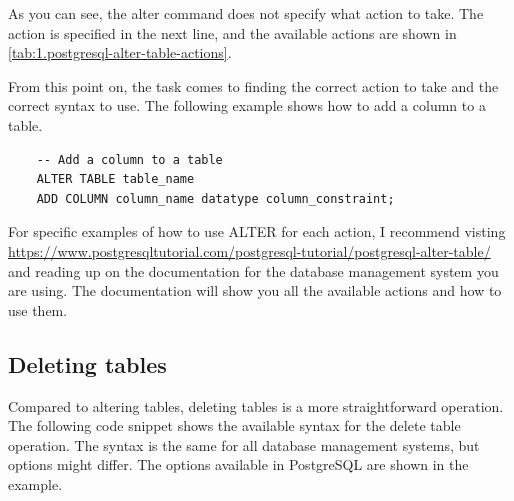 As you can see, the alter command does not specify what action to take. The action is specified in the next line, and the available actions are shown in \cref{tab:1.postgresql-alter-table-actions}.

\begin{table}[htb]
    \centering
    \caption{Available actions for the ALTER TABLE statement}
    \label{tab:1.postgresql-alter-table-actions}
\end{table}

From this point on, the task comes to finding the correct action to take and the correct syntax to use. The following example shows how to add a column to a table.

\begin{verbatim}
    -- Add a column to a table
    ALTER TABLE table_name 
    ADD COLUMN column_name datatype column_constraint;
\end{verbatim}

For specific examples of how to use ALTER for each action, I recommend visting \url{https://www.postgresqltutorial.com/postgresql-tutorial/postgresql-alter-table/} and reading up on the documentation for the database management system you are using. The documentation will show you all the available actions and how to use them.


\subsection{Deleting tables}
Compared to altering tables, deleting tables is a more straightforward operation. The following code snippet shows the available syntax for the delete table operation. The syntax is the same for all database management systems, but options might differ. The options available in PostgreSQL are shown in the example.

